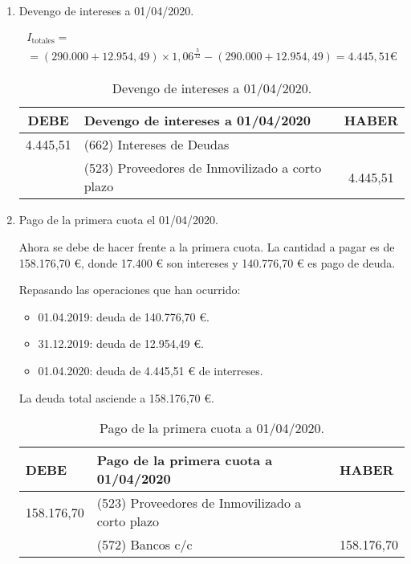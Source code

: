 \begin{enumerate}[label=\alph*)]
    \item Devengo de intereses a 01/04/2020.
    
    \begin{align*}
        I_{\text{totales}} = \\
        = (290.000 + 12.954,49) \times 1,06^{\frac{3}{12}} - (290.000 + 12.954,49) = 4.445,51 €
    \end{align*}

    \begin{table}[H]
        \centering
        \begin{tabular}{|c|p{6cm}|c|}
            \hline
            \rowcolor{blue!30}
            \textbf{DEBE} & \textbf{Devengo de intereses a 01/04/2020} & \textbf{HABER} \\
            \hline
            4.445,51 & (662) Intereses de Deudas & \\
            \hline
            & (523) Proveedores de Inmovilizado a corto plazo & 4.445,51 \\
            \hline
        \end{tabular}
        \caption{Devengo de intereses a 01/04/2020.}
        \label{tabla:devengo_intereses_abril_2020}
    \end{table}

    \item Pago de la primera cuota el 01/04/2020.

    Ahora se debe de hacer frente a la primera cuota. La cantidad a pagar es de 158.176,70 €, donde 17.400 € son intereses y 140.776,70 € es pago de deuda.

    Repasando las operaciones que han ocurrido:
    \begin{itemize}
        \item 01.04.2019: deuda de 140.776,70 €.
        \item 31.12.2019: deuda de 12.954,49 €.
        \item 01.04.2020: deuda de 4.445,51 € de interreses.
    \end{itemize}

    La deuda total asciende a 158.176,70 €.

    \begin{table}[H]
        \centering
        \begin{tabular}{|p{2cm}|p{6cm}|p{2cm}|}
            \hline
            \rowcolor{blue!30}
            \textbf{DEBE} & \textbf{Pago de la primera cuota a 01/04/2020} & \textbf{HABER} \\
            \hline
            158.176,70 & (523) Proveedores de Inmovilizado a corto plazo & \\
            \hline
            & (572) Bancos c/c & 158.176,70 \\
            \hline
        \end{tabular}
        \caption{Pago de la primera cuota a 01/04/2020.}
        \label{tabla:pago_primera_cuota_2020}
    \end{table}


\end{enumerate}
